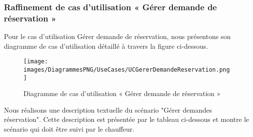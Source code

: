 {\subsubsection{Raffinement de cas d'utilisation « Gérer demande de réservation »}
Pour le cas d'utilisation Gérer demande de réservation, nous présentons son diagramme de cas d'utilisation détaillé à travers la figure ci-dessous.\\

\begin{figure}[H]
\centering
\texttt{[image: images/DiagrammesPNG/UseCases/UCGererDemandeReservation.png]}
\caption{Diagramme de cas d'utilisation « Gérer demande de réservation »}
\end{figure}

Nous réalisons une description textuelle du scénario "Gérer demandes réservation". Cette description est présentée par le tableau ci-dessous et montre le scénario qui doit être suivi par le chauffeur.\\

}
